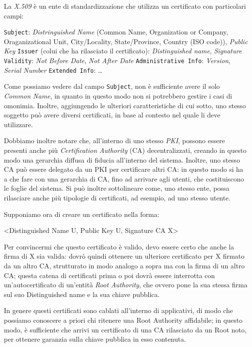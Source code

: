 La \textit{X.509} è un ente di standardizzazione che utilizza un certificato con particolari
campi:
\begin{itemize}
\diam \texttt{Subject}: \textit{Distringuished Name} (Common Name, Organization or Company, 
	Oraganizational Unit, City/Locality, State/Province, Country (ISO code)),
	\textit{Public Key}
\diam \texttt{Issuer} (colui che ha rilasciato il certificato): \textit{Distinguished 
	name}, \textit{Signature} 
\diam \texttt{Validity}: \textit{Not Before Date}, \textit{Not After Date}
\diam \texttt{Administrative Info}: \textit{Version}, \textit{Serial Number}
\diam \texttt{Extended Info}:  \dots
\end{itemize}
Come possiamo vedere dal campo \texttt{Subject}, non è sufficiente avere il solo
\textit{Common Name}, in quanto in questo modo non si potrebbero gestire
i casi di omonimia. Inoltre, aggiungendo le ulteriori caratteristiche di cui
sotto, uno stesso soggetto può avere diversi certificati, in base al contesto
nel quale li deve utilizzare.

Dobbiamo inoltre notare che, all'interno di uno stesso
\textit{PKI}, possono essere presenti anche più \textit{Certification Authority} (CA)
decentralizzati, creando in questo modo una gerarchia diffusa di fiducia all'interno
del sistema. Inoltre, uno stesso CA può essere delegato da un PKI per certificare
altri CA: in questo modo si ha a che fare con una gerarchia di CA, fino ad
arrivare agli utenti, che costituiscono le foglie del sistema. Si può inoltre 
sottolineare come, uno stesso ente, possa rilasciare 
anche più tipologie di certificati, ad esempio, ad uno stesso utente.
\medskip

Supponiamo ora di creare un certificato nella forma:
\begin{center}
<Distinguished Name U, Public Key U, Signature CA X>
\end{center}
Per convincermi che questo certificato è valido, devo essere certo che anche la
firma di X sia valida: dovrò quindi ottenere un ulteriore certificato per X 
firmato da un altro CA, strutturato in modo analogo a sopra ma con la firma di
un altro CA; questa catena di certificati prima o poi dovrà essere interrotta
con un'autocertificato di un'entità \textit{Root Authority}, che ovvero pone la sua stessa
firma sul suo Distinguished name e la sua chiave pubblica.

In genere questi certificati sono cablati all'interno di applicativi, di modo
che possiamo conoscere a priori chi ritenere una Root Authority affidabile; in questo 
modo, è sufficiente che arrivi un certificato di una CA rilasciato da un Root
noto, per ottenere garanzia sulla chiave pubblica in esso contenuta.
\medskip

